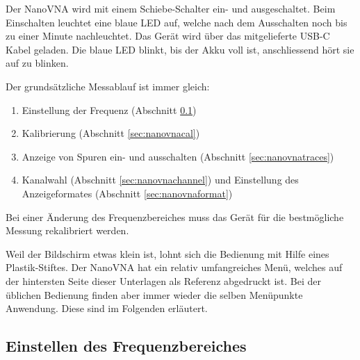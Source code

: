 \documentclass[twoside,a4paper,11pt,halfparskip,DIV=11,notitlepage]{scrartcl}
\begin{document}
Der NanoVNA wird mit einem Schiebe-Schalter ein- und ausgeschaltet. Beim Einschalten
leuchtet eine blaue LED auf, welche nach dem Ausschalten noch bis zu einer Minute
nachleuchtet. Das Gerät wird über das mitgelieferte USB-C Kabel geladen. Die blaue
LED blinkt, bis der Akku voll ist, anschliessend hört sie auf zu blinken.

Der grundsätzliche Messablauf ist immer gleich:

\begin{enumerate}
    \item Einstellung der Frequenz (Abschnitt \ref{sec:nanovnafreq})
    \item Kalibrierung (Abschnitt \ref{sec:nanovnacal})
    \item Anzeige von Spuren ein- und ausschalten (Abschnitt \ref{sec:nanovnatraces})
    \item Kanalwahl (Abschnitt \ref{sec:nanovnachannel}) und Einstellung des Anzeigeformates
        (Abschnitt \ref{sec:nanovnaformat})
\end{enumerate}

Bei einer Änderung des Frequenzbereiches muss das Gerät für die bestmögliche Messung
rekalibriert werden.

Weil der Bildschirm etwas klein ist, lohnt sich die Bedienung mit Hilfe eines
Plastik-Stiftes. Der NanoVNA hat ein relativ umfangreiches Menü, welches auf der
hintersten Seite dieser Unterlagen als Referenz abgedruckt ist. Bei der
üblichen Bedienung finden aber immer wieder die selben Menüpunkte Anwendung.
Diese sind im Folgenden erläutert.

\subsection{Einstellen des Frequenzbereiches}\label{sec:nanovnafreq}

\begin{center}\end{center}
\end{document}
